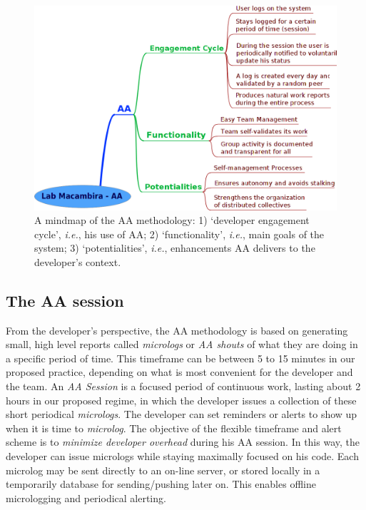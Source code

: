 \documentclass{article}
\newcommand{\ie}{{\it i.e.}}
\begin{document}
\begin{figure}
\begin{center}
   \includegraphics[width=0.8\linewidth,keepaspectratio=true]{figs/aa-mm.png}
\end{center}
   \caption{
   A mindmap of the AA methodology: 1) `developer engagement cycle', \ie, his use
   of AA; 2) `functionality', \ie, main goals of the system; 3) `potentialities',
   \ie, enhancements AA delivers to the developer's context. 
   }
\label{fig:mm}
\end{figure}

\subsection{The AA session}

From the developer's perspective, the AA methodology is based on generating
small, high level reports called \emph{micrologs} or \emph{AA shouts} of what
they are doing in a specific period of time.  This timeframe can be
between 5 to 15 minutes in our proposed practice, depending on what is most
convenient for the developer and the team. An \emph{AA Session} is a focused
period of continuous work, lasting about 2 hours in our proposed regime, in
which the developer issues a collection of these short periodical
\emph{micrologs}. The developer can set reminders or alerts to show up when it
is time to \emph{microlog}. The objective of the flexible timeframe and alert
scheme is to \emph{minimize developer overhead} during his AA session.  In this
way, the developer can issue micrologs while staying maximally focused on
his code. Each microlog may be sent directly to an on-line server, or stored
locally in a temporarily database for sending/pushing later on.  This enables
offline micrologging and periodical alerting.
\end{document}
